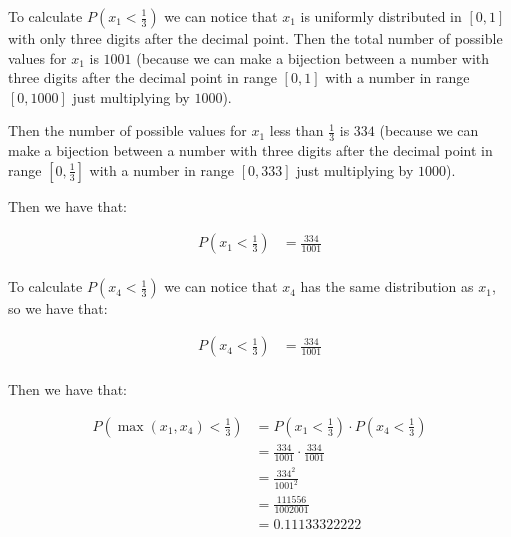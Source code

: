 To calculate $P(x_1 < \frac{1}{3})$ we can notice that $x_1$ is
uniformly distributed in $[0,1]$ with only three digits after the
decimal point. Then the total number of possible values for $x_1$ is
$1001$ (because we can make a bijection between a number with three
digits after the decimal point in range $[0,1]$ with a number in
range $[0,1000]$ just multiplying by $1000$).

Then the number of possible values for $x_1$ less than $\frac{1}{3}$
is $334$ (because we can make a bijection between a number with three
digits after the decimal point in range $[0,\frac{1}{3}]$ with a
number in range $[0,333]$ just multiplying by $1000$).

Then we have that:

\begin{equation*}
    \begin{split}
        P(x_1 < \frac{1}{3}) & = \frac{334}{1001} \\
    \end{split}
\end{equation*}

To calculate $P(x_4 < \frac{1}{3})$ we can notice that $x_4$ has
the same distribution as $x_1$, so we have that:

\begin{equation*}
    \begin{split}
        P(x_4 < \frac{1}{3}) & = \frac{334}{1001} \\
    \end{split}
\end{equation*}

Then we have that:

\begin{equation*}
    \begin{split}
        P(\max(x_1, x_4) < \frac{1}{3}) & = P(x_1 < \frac{1}{3}) \cdot P(x_4 < \frac{1}{3}) \\
                                        & = \frac{334}{1001} \cdot \frac{334}{1001}         \\
                                        & = \frac{334^2}{1001^2}                            \\
                                        & = \frac{111556}{1002001}                          \\
                                        & = 0.11133322222
    \end{split}
\end{equation*}